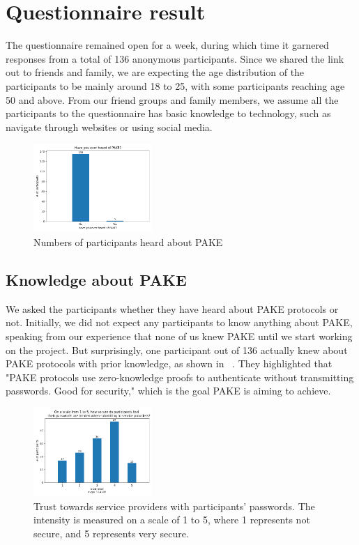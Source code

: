 \section{Questionnaire result}




The questionnaire remained open for a week, during which time it garnered responses from a total of 136 anonymous participants.
Since we shared the link out to friends and family, we are expecting the age distribution of the participants to be mainly around 18 to 25, with some participants reaching age 50 and above.
From our friend groups and family members, we assume all the participants to the questionnaire has basic knowledge to technology, such as navigate through websites or using social media.

\begin{figure}[ht]
  \centering
  \includegraphics[width=0.4\textwidth]{./images/know_pake.png}
  \caption{Numbers of participants heard about PAKE}
  \label{fig:know_pake}
\end{figure}

\subsection{Knowledge about PAKE}
We asked the participants whether they have heard about PAKE protocols or not.
Initially, we did not expect any participants to know anything about PAKE, speaking from our experience that none of us knew PAKE until we start working on the project.
But surprisingly, one participant out of 136 actually knew about PAKE protocols with prior knowledge, as shown in ~.
They highlighted that "PAKE protocols use zero-knowledge proofs to authenticate without transmitting passwords. Good for security," which is the goal PAKE is aiming to achieve.





\begin{figure}[ht]
  \centering
  \includegraphics[width=0.4\textwidth]{./images/service_provider_trust.png}
  \caption{Trust towards service providers with participants' passwords.
    The intensity is measured on a scale of 1 to 5, where 1 represents not secure, and 5 represents very secure.}
  \label{fig:trust}
\end{figure}


